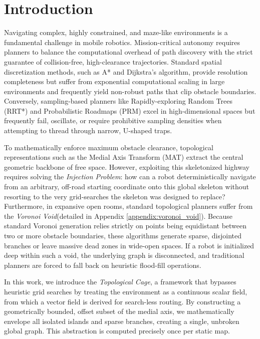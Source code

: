 \documentclass[letterpaper, 10 pt, conference]{IEEEtran}
\begin{document}
\section{Introduction}
Navigating complex, highly constrained, and maze-like environments is a fundamental challenge in mobile robotics. Mission-critical autonomy requires planners to balance the computational overhead of path discovery with the strict guarantee of collision-free, high-clearance trajectories. Standard spatial discretization methods, such as A* and Dijkstra's algorithm, provide resolution completeness but suffer from exponential computational scaling in large environments and frequently yield non-robust paths that clip obstacle boundaries. Conversely, sampling-based planners like Rapidly-exploring Random Trees (RRT*) and Probabilistic Roadmaps (PRM) excel in high-dimensional spaces but frequently fail, oscillate, or require prohibitive sampling densities when attempting to thread through narrow, U-shaped traps.

To mathematically enforce maximum obstacle clearance, topological representations such as the Medial Axis Transform (MAT) extract the central geometric backbone of free space. However, exploiting this skeletonized highway requires solving the \textit{Injection Problem}: how can a robot deterministically navigate from an arbitrary, off-road starting coordinate onto this global skeleton without resorting to the very grid-searches the skeleton was designed to replace? Furthermore, in expansive open rooms, standard topological planners suffer from the \textit{Voronoi Void}(detailed in Appendix \ref{appendix:voronoi_void}). Because standard Voronoi generation relies strictly on points being equidistant between two or more obstacle boundaries, these algorithms generate sparse, disjointed branches or leave massive dead zones in wide-open spaces. If a robot is initialized deep within such a void, the underlying graph is disconnected, and traditional planners are forced to fall back on heuristic flood-fill operations.

In this work, we introduce the \textit{Topological Cage}, a framework that bypasses heuristic grid searches by treating the environment as a continuous scalar field, from which a vector field is derived for search-less routing. By constructing a geometrically bounded, offset subset of the medial axis, we mathematically envelope all isolated islands and sparse branches, creating a single, unbroken global graph. This abstraction is computed precisely once per static map. 
\end{document}
